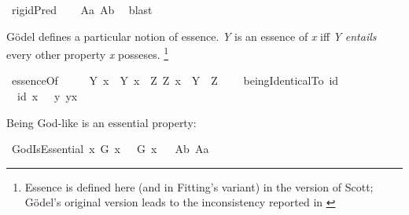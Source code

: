 \begin{isabellebody}
\ {\isachardoublequoteopen}{\isasymlfloor}rigidPred\ {\isasymP}{\isasymrfloor}{\isachardoublequoteclose}%
\ %
%
\isamarkupfalse%
\ A{}a\ A{}b\ \isamarkupfalse%
\ blast%
%
%
%
\begin{isamarkuptext}%
G\"odel defines a particular notion of essence. \emph{Y} is an essence of \emph{x} iff \emph{Y}
\emph{entails} every other property \emph{x} posseses.
\footnote{Essence is defined here (and in Fitting's variant) in the version of Scott; G\"odel's original version
 leads to the inconsistency reported in \cite{C55,C60}}%
\end{isamarkuptext}\isamarkuptrue%
\isamarkupfalse%
\ essenceOf{\isacharcolon}{\isacharcolon}{\isachardoublequoteopen}{\isasymup}{\isasymlangle}{\isasymup}{\isasymlangle}{\isasymzero}{\isasymrangle}{\isacharcomma}{\isasymzero}{\isasymrangle}{\isachardoublequoteclose}\ {\isacharparenleft}{\isachardoublequoteopen}{\isasymE}{\isachardoublequoteclose}{\isacharparenright}\ \isanewline
\ \ {\isachardoublequoteopen}{\isasymE}\ Y\ x\ {\isasymequiv}\ {\isacharparenleft}Y\ x{\isacharparenright}\ \isactrlbold {\isasymand}\ {\isacharparenleft}\isactrlbold {\isasymforall}Z{\isachardot}\ Z\ x\ \isactrlbold {\isasymrightarrow}\ Y\ {\isasymRrightarrow}\ Z{\isacharparenright}{\isachardoublequoteclose}\ \ \ \isanewline
{}\isamarkupfalse%
\ beingIdenticalTo{\isacharcolon}{\isacharcolon}{\isachardoublequoteopen}{\isasymzero}{\isasymRightarrow}{\isasymup}{\isasymlangle}{\isasymzero}{\isasymrangle}{\isachardoublequoteclose}\ {\isacharparenleft}{\isachardoublequoteopen}id{\isachardoublequoteclose}{\isacharparenright}\ \isanewline
\ \ {\isachardoublequoteopen}id\ x\ \ {\isasymequiv}\ {\isacharparenleft}{\isasymlambda}y{\isachardot}\ y\isactrlbold {\isasymapprox}x{\isacharparenright}{\isachardoublequoteclose}\ %
%
\begin{isamarkuptext}%
Being God-like is an essential property:%
\end{isamarkuptext}\isamarkuptrue%
\isamarkupfalse%
\ GodIsEssential{\isacharcolon}\ {\isachardoublequoteopen}{\isasymlfloor}\isactrlbold {\isasymforall}x{\isachardot}\ G\ x\ \isactrlbold {\isasymrightarrow}\ {\isacharparenleft}{\isasymE}\ G\ x{\isacharparenright}{\isasymrfloor}{\isachardoublequoteclose}%
\ %
%
\isamarkupfalse%
\ A{}b\ A{}a\ \isamarkupfalse%

\end{isabellebody}
